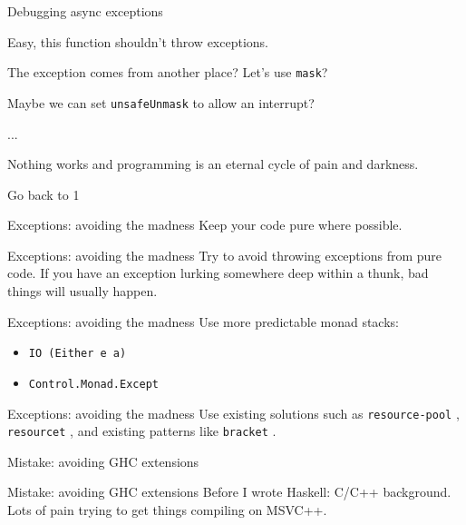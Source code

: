 \documentclass[20pt]{beamer}
\newcommand{\chapterslide}[1]{
    {
        \begin{frame}[plain]
        \begin{center}
        \large{#1}
        \end{center}
        \end{frame}
    }
}
\newcommand{\code}[1]{
    \texttt{\small{#1}}
}
\begin{document}
\begin{frame}{Debugging async exceptions}
    \begin{enumerate}
    \normalsize{\item Easy, this function shouldn't throw exceptions.}
    \small{\item The exception comes from another place? Let's use
        \texttt{mask}?}
    \footnotesize{\item Maybe we can set \texttt{unsafeUnmask} to allow an
        interrupt?}
    \footnotesize{\item ...}
    \tiny{\item Nothing works and programming is an eternal cycle of pain and
        darkness.}
    \tiny{\item Go back to 1}
    \end{enumerate}
\end{frame}

\begin{frame}{Exceptions: avoiding the madness}
    Keep your code pure where possible.
\end{frame}

\begin{frame}{Exceptions: avoiding the madness}
    Try to avoid throwing exceptions from pure code. If you have an exception
    lurking somewhere deep within a thunk, bad things will usually happen.
\end{frame}

\begin{frame}{Exceptions: avoiding the madness}
    Use more predictable monad stacks:
    \begin{itemize}
    \item \code{IO (Either e a)}
    \item \code{Control.Monad.Except}
    \end{itemize}
\end{frame}

\begin{frame}{Exceptions: avoiding the madness}
    Use existing solutions such as \code{resource-pool}, \code{resourcet}, and
    existing patterns like \code{bracket}.
\end{frame}


\chapterslide{Mistake: avoiding GHC extensions}

\begin{frame}{Mistake: avoiding GHC extensions}
    Before I wrote Haskell: C/C++ background. Lots of pain trying to get things
    compiling on MSVC++.
\end{frame}
\end{document}
